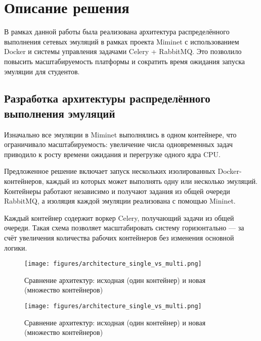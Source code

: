 
\section{Описание решения}
\label{sec:solution}

В рамках данной работы была реализована архитектура распределённого выполнения сетевых эмуляций в рамках проекта Miminet\cite{miminet} с использованием Docker и системы управления задачами Celery + RabbitMQ\cite{rabbitmq}.
Это позволило повысить масштабируемость платформы и сократить время ожидания запуска эмуляции для студентов.

\subsection{Разработка архитектуры распределённого выполнения эмуляций}
\label{subsec:task1}

Изначально все эмуляции в Miminet\cite{miminet} выполнялись в одном контейнере, что ограничивало масштабируемость: увеличение числа одновременных задач приводило к росту времени ожидания и перегрузке одного ядра CPU.

Предложенное решение включает запуск нескольких изолированных Docker-контейнеров, каждый из которых может выполнять одну или несколько эмуляций. Контейнеры работают независимо и получают задания из общей очереди RabbitMQ\cite{rabbitmq}, а изоляция каждой эмуляции реализована с помощью Mininet\cite{mininet}.

Каждый контейнер содержит воркер Celery\cite{celery}, получающий задачи из общей очереди. Такая схема позволяет масштабировать систему горизонтально — за счёт увеличения количества рабочих контейнеров без изменения основной логики.

\begin{figure}[H]
  \centering
  \texttt{[image: figures/architecture\_single\_vs\_multi.png]}
  \caption{Сравнение архитектур: исходная (один контейнер) и новая (множество контейнеров)}
  \label{fig:arch_compare}
\end{figure}

\begin{figure}[H]
  \centering
  \texttt{[image: figures/architecture\_single\_vs\_multi.png]}
  \caption{Сравнение архитектур: исходная (один контейнер) и новая (множество контейнеров)}
  \label{fig:arch_compare}
\end{figure}

